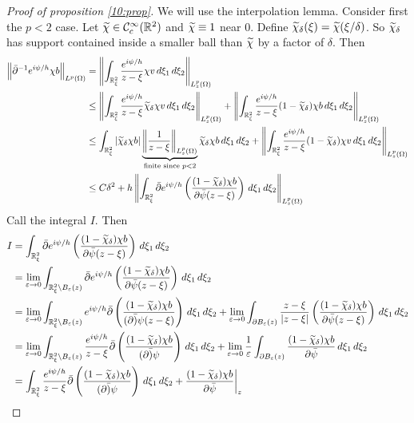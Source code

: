 \begin{proof}[Proof of proposition \ref{10:prop}]
  We will use the interpolation lemma.
  Consider first the $p<2$ case.
  Let $\widetilde\chi\in\mathcal{C}_c^\infty(\mathbb{R}^2)$ and $\widetilde\chi\equiv1$ near $0$.
  Define $\widetilde\chi_\delta(\xi)=\widetilde\chi(\xi/\delta)$.
  So $\widetilde\chi_\delta$ has support contained inside a smaller ball than $\widetilde\chi$ by a factor of $\delta$.
  Then
  \begin{align*}
    \left\lVert \bar{\partial}^{-1} e^{i\psi/h}\chi b \right\rVert_{L^p(\Omega)} &= \left\lVert \int_{\mathbb{R}_\xi^2}\frac{e^{i\psi/h}}{z-\xi}\chi v \, d\xi_1 \, d\xi_2 \right\rVert_{L_z^p(\Omega)} \\
    &\leq \left\lVert \int_{\mathbb{R}_\xi^2}\frac{e^{i\psi/h}}{z-\xi}\widetilde\chi_\delta\chi v \, d\xi_1 \, d\xi_2 \right\rVert_{L_z^p(\Omega)} + \left\lVert \int_{\mathbb{R}_\xi^2}\frac{e^{i\psi/h}}{z-\xi}(1-\widetilde\chi_\delta)\chi b \, d\xi_1 \, d\xi_2 \right\rVert_{L_z^p(\Omega)} \\
    &\leq \int_{\mathbb{R}_\xi^2}\left\lvert \widetilde\chi_\delta\chi b \right\rvert\underbrace{\left\lVert \frac{1}{z-\xi} \right\rVert_{L_z^p(\Omega)}}_{\text{finite since }p<2}\widetilde\chi_\delta\chi b \, d\xi_1 \, d\xi_2 + \left\lVert \int_{\mathbb{R}_\xi^2}\frac{e^{i\psi/h}}{z-\xi}(1-\widetilde\chi_\delta)\chi v \, d\xi_1 \, d\xi_2 \right\rVert_{L_z^p(\Omega)} \\
  &\leq C\delta^2 + h\left\lVert \int_{\mathbb{R}_\xi^2}\bar{\partial} e^{i\psi/h}\left( \frac{(1-\widetilde\chi_\delta)\chi b}{\partial\bar\psi(z-\xi)}\right) \, d\xi_1 \, d\xi_2 \right\rVert_{L_z^p(\Omega)}
  \end{align*}
  Call the integral $I$.
  Then
  \begin{align*}
    I &= \int_{\RR_\xi^2}\bar\p e^{i\psi/h}\left( \frac{(1-\wt\chi_\delta)\chi b}{\p\bar\psi(z-\xi)}\right) \, d\xi_1 \, d\xi_2 \\
    &= \lim_{\eps\to0} \int_{\RR_\xi^2\setminus B_\eps(z)}\bar\p e^{i\psi/h}\left( \frac{(1-\wt\chi_\delta)\chi b}{\p\bar\psi(z-\xi)}\right) \, d\xi_1 \, d\xi_2 \\
    &= \lim_{\eps\to0} \int_{\RR_\xi^2\setminus B_\eps(z)}e^{i\psi/h}\bar\p \left( \frac{(1-\wt\chi_\delta)\chi b}{(\p\bar)\psi(z-\xi)}\right) \, d\xi_1 \, d\xi_2 + \lim_{\eps\to0} \int_{\p B_\eps(z)}\frac{z-\xi}{\abs{z-\xi}}\left( \frac{(1-\wt\chi_\delta)\chi b}{\p\bar\psi(z-\xi)}\right) \, d\xi_1 \, d\xi_2 \\
    &= \lim_{\eps\to0} \int_{\RR_\xi^2\setminus B_\eps(z)}\frac{e^{i\psi/h}}{z-\xi}\bar\p \left( \frac{(1-\wt\chi_\delta)\chi b}{(\p\bar)\psi}\right) \, d\xi_1 \, d\xi_2 + \lim_{\eps\to0} \frac1\eps \int_{\p B_\eps(z)}\frac{(1-\wt\chi_\delta)\chi b}{\p\bar\psi} \, d\xi_1 \, d\xi_2 \\
    &= \int_{\RR_\xi^2}\frac{e^{i\psi/h}}{z-\xi}\bar\p \left( \frac{(1-\wt\chi_\delta)\chi b}{(\p\bar)\psi}\right) \, d\xi_1 \, d\xi_2 + \frac{(1-\wt\chi_\delta)\chi b}{\p\bar\psi}\bigg\vert_z \\

\end{align*}
\end{proof}
